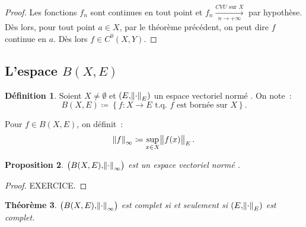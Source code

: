 \documentclass{report}
\newtheorem{thm}{Théorème}[chapter]
\newtheorem{prp}[thm]{Proposition}
\theoremstyle{definition}
\newtheorem{déf}[thm]{Définition}
\theoremstyle{remark}
\numberwithin{equation}{section}
\newcommand{\tq}{\text{ t.q. }}
\newcommand{\CONV}[5]{\xrightarrow[#2 \to #3]{#4 \text{ #5 } #1}}
\newcommand{\CVU}[3]{\CONV{#1}{#2}{#3}{CVU}{sur}}
\newcommand{\pinfty}{{+\infty}}
\newcommand{\evn}{espace vectoriel normé }
\begin{document}
			\begin{proof} Les fonctions $f_n$ sont continues en tout point et $f_n \CVU Xn\pinfty$ par hypothèse. Dès lors, pour tout point $a \in X$, par le
			théorème précédent, on peut dire $f$ continue en $a$. Dès lors $f \in C^0(X, Y)$.
			\end{proof}

		\subsection{L'espace $B(X, E)$}
			\begin{déf} Soient $X \neq \emptyset$ et $(E, \norm \cdot_E)$ un \evn. On note~:
			\begin{equation}
				B(X, E) \coloneqq \left\{f : X \to E \tq f \text{ est bornée sur } X\right\}.
			\end{equation}

			Pour $f \in B(X, E)$, on définit~:
			\begin{equation}
				\norm f_\infty \coloneqq \sup_{x \in X}\norm {f(x)}_E.
			\end{equation}
			\end{déf}

			\begin{prp} $\left(B(X, E), \norm \cdot_\infty\right)$ est un \evn. \end{prp}

			\begin{proof} EXERCICE.
			\end{proof}

			\begin{thm}\label{thm:BXEcpltssiEcplt} $\left(B(X, E), \norm \cdot_\infty\right)$ est complet si et seulement si $(E, \norm \cdot_E)$ est complet.
			\end{thm}
\end{document}
